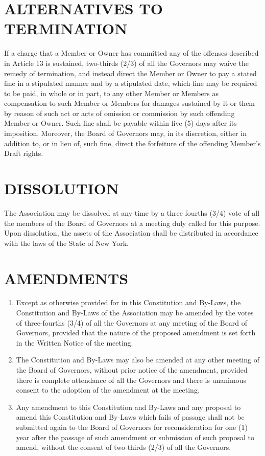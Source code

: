 \documentclass[]{book}
\providecommand{\tightlist}{%
  \setlength{\itemsep}{0pt}\setlength{\parskip}{0pt}}
\theoremstyle{definition}
\theoremstyle{definition}
\theoremstyle{definition}
\theoremstyle{remark}
\begin{document}
\section{ALTERNATIVES TO TERMINATION}\label{alternatives-to-termination}

If a charge that a Member or Owner has committed any of the offenses
described in Article 13 is sustained, two-thirds (2/3) of all the
Governors may waive the remedy of termination, and instead direct the
Member or Owner to pay a stated fine in a stipulated manner and by a
stipulated date, which fine may be required to be paid, in whole or in
part, to any other Member or Members as compensation to such Member or
Members for damages sustained by it or them by reason of such act or
acts of omission or commission by such offending Member or Owner. Such
fine shall be payable within five (5) days after its imposition.
Moreover, the Board of Governors may, in its discretion, either in
addition to, or in lieu of, such fine, direct the forfeiture of the
offending Member's Draft rights.

\section{DISSOLUTION}\label{dissolution}

The Association may be dissolved at any time by a three fourths (3/4)
vote of all the members of the Board of Governors at a meeting duly
called for this purpose. Upon dissolution, the assets of the Association
shall be distributed in accordance with the laws of the State of New
York.

\section{AMENDMENTS}\label{amendments}

\begin{enumerate}
\def\labelenumi{(\alph{enumi})}
\tightlist
\item
  Except as otherwise provided for in this Constitution and By-Laws, the
  Constitution and By-Laws of the Association may be amended by the
  votes of three-fourths (3/4) of all the Governors at any meeting of
  the Board of Governors, provided that the nature of the proposed
  amendment is set forth in the Written Notice of the meeting.
\item
  The Constitution and By-Laws may also be amended at any other meeting
  of the Board of Governors, without prior notice of the amendment,
  provided there is complete attendance of all the Governors and there
  is unanimous consent to the adoption of the amendment at the meeting.
\item
  Any amendment to this Constitution and By-Laws and any proposal to
  amend this Constitution and By-Laws which fails of passage shall not
  be submitted again to the Board of Governors for reconsideration for
  one (1) year after the passage of such amendment or submission of such
  proposal to amend, without the consent of two-thirds (2/3) of all the
  Governors.
\end{enumerate}
\end{document}
